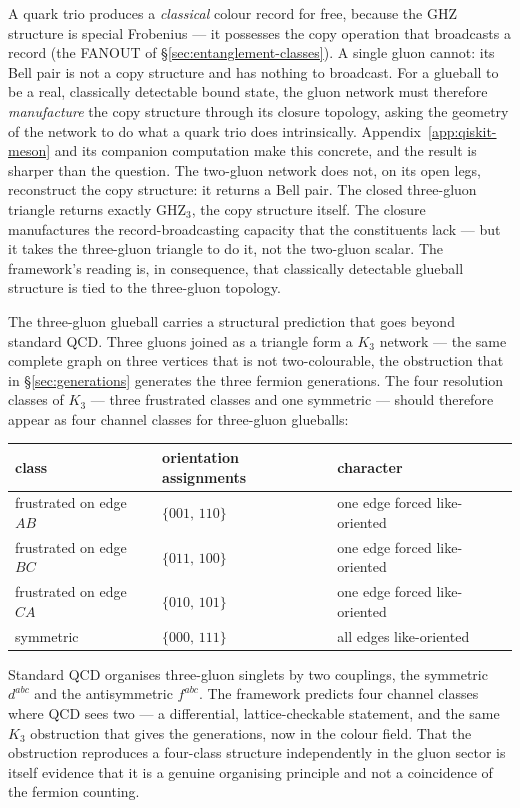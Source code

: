 A quark trio produces a \emph{classical} colour record for free, because the GHZ structure is special
Frobenius --- it possesses the copy operation that broadcasts a record (the FANOUT of
\S\ref{sec:entanglement-classes}). A single gluon cannot: its Bell pair is not a copy structure and
has nothing to broadcast. For a glueball to be a real, classically detectable bound state, the gluon
network must therefore \emph{manufacture} the copy structure through its closure topology, asking the
geometry of the network to do what a quark trio does intrinsically. Appendix~\ref{app:qiskit-meson}
and its companion computation make this concrete, and the result is sharper than the question. The
two-gluon network does not, on its open legs, reconstruct the copy structure: it returns a Bell pair.
The closed three-gluon triangle returns exactly $\mathrm{GHZ}_3$, the copy structure itself. The
closure manufactures the record-broadcasting capacity that the constituents lack --- but it takes the
three-gluon triangle to do it, not the two-gluon scalar. The framework's reading is, in consequence,
that classically detectable glueball structure is tied to the three-gluon topology.

The three-gluon glueball carries a structural prediction that goes beyond standard QCD. Three gluons
joined as a triangle form a $K_3$ network --- the same complete graph on three vertices that is not
two-colourable, the obstruction that in \S\ref{sec:generations} generates the three fermion
generations. The four resolution classes of $K_3$ --- three frustrated classes and one symmetric ---
should therefore appear as four channel classes for three-gluon glueballs:

\begin{center}
\begin{tabular}{lll}
\hline
class & orientation assignments & character \\
\hline
frustrated on edge $AB$ & $\{001,\,110\}$ & one edge forced like-oriented \\
frustrated on edge $BC$ & $\{011,\,100\}$ & one edge forced like-oriented \\
frustrated on edge $CA$ & $\{010,\,101\}$ & one edge forced like-oriented \\
symmetric               & $\{000,\,111\}$ & all edges like-oriented \\
\hline
\end{tabular}
\end{center}

Standard QCD organises three-gluon singlets by two couplings, the symmetric $d^{abc}$ and the
antisymmetric $f^{abc}$. The framework predicts four channel classes where QCD sees two --- a
differential, lattice-checkable statement, and the same $K_3$ obstruction that gives the generations,
now in the colour field. That the obstruction reproduces a four-class structure independently in the
gluon sector is itself evidence that it is a genuine organising principle and not a coincidence of
the fermion counting.

